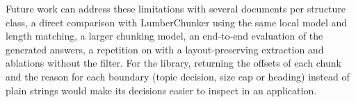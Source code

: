 Future work can address these limitations with several documents per structure class, a direct comparison with LumberChunker using the same local model and length matching, a
larger chunking model, an end-to-end evaluation of the generated answers, a repetition on
 with a layout-preserving extraction and ablations without the filter. For the
library, returning the offsets of each chunk and the reason for each boundary (topic
decision, size cap or heading) instead of plain strings would make its decisions easier to
inspect in an application.
